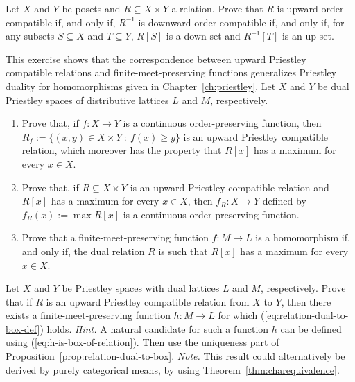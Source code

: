 \begin{exercise}\label{exe:ordercompatible}
Let $X$ and $Y$ be posets and $R \subseteq X \times Y$ a relation. Prove that  $R$ is upward order-compatible if, and only if, $R^{-1}$ is downward order-compatible if, and only if, for any subsets $S \subseteq X$ and $T \subseteq Y$, $R[S]$ is a down-set and $R^{-1}[T]$ is an up-set.
\end{exercise}

\begin{exercise}\label{exe:functionalcompatible}
This exercise shows that the correspondence between upward Priestley compatible relations and finite-meet-preserving functions generalizes Priestley duality for homomorphisms given in Chapter~\ref{ch:priestley}. Let $X$ and $Y$ be dual Priestley spaces of distributive lattices $L$ and $M$, respectively.
\begin{enumerate}
  \item Prove that, if $f \colon X \to Y$ is a continuous order-preserving function, then $R_f := \{(x,y) \in X \times Y \ \colon \ f(x) \geq y \}$ is an upward Priestley compatible relation, which moreover has the property that $R[x]$ has a maximum for every $x \in X$.
  \item Prove that, if $R \subseteq X \times Y$ is an upward Priestley compatible relation and $R[x]$ has a maximum for every $x \in X$, then $f_R \colon X \to Y$ defined by $f_R(x) := \max R[x]$ is a continuous order-preserving function.
  \item Prove that a finite-meet-preserving function $f \colon M \to L$ is a homomorphism if, and only if, the dual relation $R$ is such that $R[x]$ has a maximum for every $x \in X$.
\end{enumerate}
\end{exercise}

\begin{exercise}\label{exe:every-compatible-relation-comes-from}
  Let $X$ and $Y$ be Priestley spaces with dual lattices $L$ and $M$, respectively. Prove that if $R$ is an upward Priestley compatible relation from $X$ to $Y$, then there exists a finite-meet-preserving function $h \colon M \to L$ for which (\ref{eq:relation-dual-to-box-def}) holds. {\it Hint.} A natural candidate for such a function $h$ can be defined using (\ref{eq:h-is-box-of-relation}). Then use the uniqueness part of Proposition~\ref{prop:relation-dual-to-box}. {\it Note.} This result could alternatively be derived by purely categorical means, by using Theorem~\ref{thm:charequivalence}.
\end{exercise}

